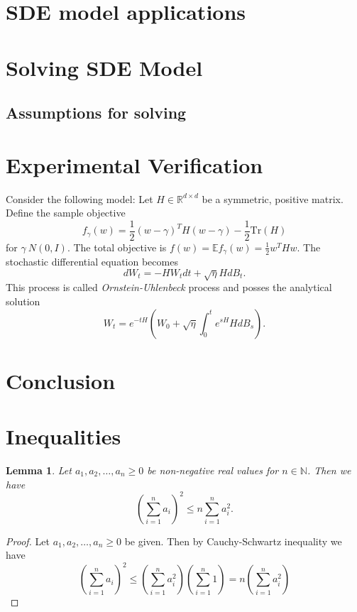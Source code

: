 \documentclass[12pt]{article}
\newtheorem{lemma}[theorem]{Lemma}
\theoremstyle{definition}
\numberwithin{equation}{section}
\newcommand{\N}{\mathbb{N}}
\begin{document}
\section{SDE model applications}
\label{sec:sdeModelApplicatios}
\section{Solving SDE Model}
\label{sec:SolvingSDEModel}
\subsection{Assumptions for solving}
\section{Experimental Verification} 
\label{sec:ExperimentalVerification}
Consider the following model: Let $H \in \mathbb{R}^{d\times d}$ be a symmetric, positive matrix. Define the sample objective 
\begin{equation}
  f_{\gamma}(w) = \frac{1}{2} (w - \gamma)^T H (w - \gamma) - \frac{1}{2} \text{Tr}(H)
\end{equation}
for $\gamma ~ N(0,I)$. The total objective is $f(w) = \mathbb{E} f_{\gamma}(w) = \frac{1}{2} w^T H w$.
The stochastic differential equation becomes 
\begin{equation}
  dW_t = -H W_t dt + \sqrt{\eta}H dB_t.
\end{equation}
This process is called \emph{Ornstein-Uhlenbeck} \autocite{uhlenbeckTheoryBrownianMotion1930} process and posses the analytical solution
\begin{equation}
  W_t = e^{-t H}(W_0 + \sqrt{\eta}\int_0^te^{s H}H dB_s).
\end{equation}
\section{Conclusion}



\printbibliography

\appendix
\section{Inequalities}
\begin{lemma}
  \label{lemma:inequality}
  Let $a_1,a_2,\dots,a_n \geq 0$ be non-negative real values for $n \in \N$. Then we have
  \begin{equation*}
    (\sum_{i=1}^na_i)^2 \leq n \sum_{i=1}^n a_i^2.
  \end{equation*}
\end{lemma}
\begin{proof}
  Let $a_1,a_2, \dots, a_n \geq 0$ be given. Then by Cauchy-Schwartz inequality we have
  \begin{equation*}
    (\sum_{i=1}^n a_i)^2 \leq (\sum_{i=1}^n a_i^2)(\sum_{i=1}^n 1) = n(\sum_{i=1}^n a_i^2)
  \end{equation*}
\end{proof}
\end{document}

